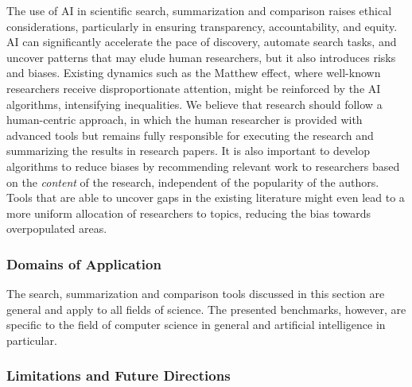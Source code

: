 The use of AI in scientific search, summarization and comparison raises ethical considerations, particularly in ensuring transparency, accountability, and equity. AI can significantly accelerate the pace of discovery, automate search tasks, and uncover patterns that may elude human researchers, but it also introduces risks and biases. %
Existing dynamics such as the Matthew effect, where well-known researchers receive disproportionate attention, might be reinforced by the AI algorithms, intensifying inequalities. We believe that research should follow a human-centric approach, in which the human researcher is provided with advanced tools but remains fully responsible for executing the research and summarizing the results in research papers. It is also important to develop algorithms to reduce biases by recommending relevant work to researchers based on the \textit{content} of the research, independent of the popularity of the authors. Tools that are able to uncover gaps in the existing literature might even lead to a more uniform allocation of researchers to topics, reducing the bias towards overpopulated areas.

\subsubsection{Domains of Application}


The search, summarization and comparison tools discussed in this section are general and apply to all fields of science. The presented benchmarks, however, are specific to the field of computer science in general and artificial intelligence in particular.

\subsubsection{Limitations and Future Directions}


